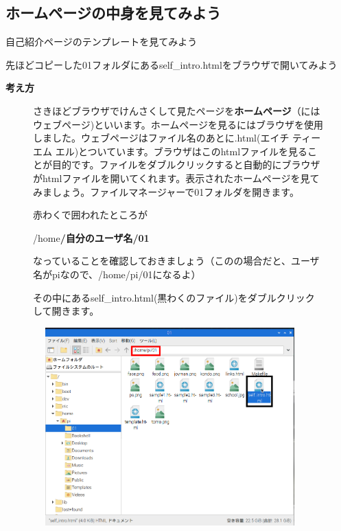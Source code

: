 \documentclass[a4paper,12pt]{jarticle}
\begin{document}
\bigskip

\clearpage
{}
\subsection{\theExercise ホームページの中身を見てみよう}
自己紹介ページのテンプレートを見てみよう

先ほどコピーした01フォルダにあるself\_intro.htmlをブラウザで開いてみよう

\textbf{考え方}



\begin{figure}[hb]
  \centering
  \begin{minipage}{16.576cm}
    さきほどブラウザでけんさくして見たページを\textbf{ホームページ}（にはウェブページ)といいます。ホームページを見るにはブラウザを使用しました。ウェブページはファイル名のあとに.html(エイチ
    ティー エム
    エル)とついています。ブラウザはこのhtmlファイルを見ることが目的です。ファイルをダブルクリックすると自動的にブラウザがhtmlファイルを開いてくれます。表示されたホームページを見てみましょう。ファイルマネージャーで01フォルダを開きます。

    赤わくで囲われたところが

    /home\textbf{/自分のユーザ名/01}

    なっていることを確認しておきましょう（このの場合だと、ユーザ名がpiなので、/home/pi/01になるよ）

    その中にあるself\_intro.html(黒わくのファイル)をダブルクリックして開きます。




    \bigskip
  \end{minipage}

  \includegraphics[width=10.559cm,height=7.634cm]{textbook-img141.png}

\end{figure}
\end{document}
